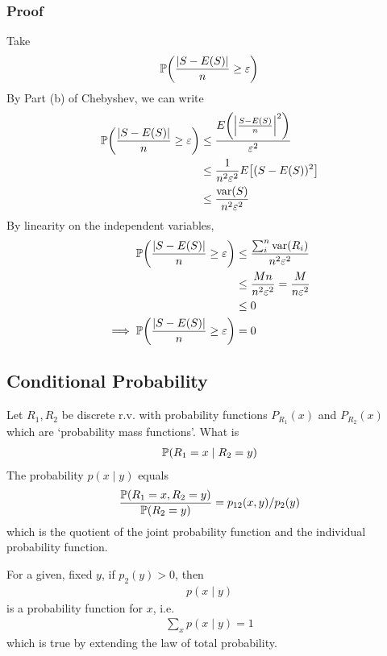\subsubsection{Proof}
Take
\begin{align}
    \mathbb{P}\qty(\frac{\abs{S - E(S)}}{n} \ge \varepsilon)
\end{align}
By Part (b) of Chebyshev, we can write
\begin{align}
    \mathbb{P}\qty(\frac{\abs{S - E(S)}}{n} \ge \varepsilon) &\le \frac{E\qty(\abs{\frac{S-E(S)}{n}}^2)}{\varepsilon^2}\\
    &\le \frac{1}{n^2\varepsilon^2} E\qty[(S - E(S))^2]\\
    &\le \frac{\text{var}(S)}{n^2\varepsilon^2}
\end{align}
By linearity on the independent variables,
\begin{align} 
    \mathbb{P}\qty(\frac{\abs{S - E(S)}}{n} \ge \varepsilon)
    &\le \frac{\sum_i^n \text{var}(R_i)}{n^2\varepsilon^2}\\
    &\le \frac{Mn}{n^2\varepsilon^2} = \frac{M}{n\varepsilon^2}\\
    &\le 0\\
    \implies \mathbb{P}\qty(\frac{\abs{S - E(S)}}{n} \ge \varepsilon) &= 0
\end{align}


\subsection{Conditional Probability}
Let $R_1,R_2$ be discrete r.v. with probability functions $P_{R_1}(x)$ and $P_{R_2}(x)$ which are `probability mass functions'. What is
\begin{align}
    \mathbb{P}(R_1 = x \mid R_2 = y)
\end{align}
The probability $p(x \mid y)$ equals
\begin{align}
    \frac{\mathbb{P}(R_1 = x, R_2 = y)}{\mathbb{P}(R_2 = y)} = p_{12}(x,y) / p_2(y)
\end{align}
which is the quotient of the joint probability function and the individual probability function.
\begin{aside}
    For a given, fixed $y$, if $p_2(y) > 0$, then
    \begin{align}
        p(x \mid y)
    \end{align}
    is a probability function for $x$, i.e.
    \begin{align}
        \sum_x p(x \mid y) = 1
    \end{align}
    which is true by extending the law of total probability.
\end{aside}

